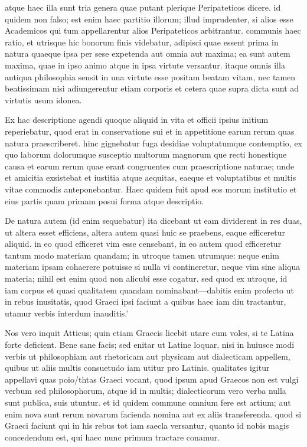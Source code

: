  atque haec illa sunt tria genera quae putant plerique Peripateticos dicere. id quidem non falso; est enim haec partitio illorum; illud imprudenter, si alios esse Academicos qui tum appellarentur alios Peripateticos arbitrantur. communis haec ratio, et utrisque hic bonorum finis videbatur, adipisci quae essent prima in natura quaeque ipsa per sese expetenda aut omnia aut maxima; ea sunt autem maxima, quae in ipso animo atque in ipsa virtute versantur. itaque omnis illa antiqua philosophia sensit in una virtute esse positam beatam vitam, nec tamen beatissimam nisi adiungerentur etiam corporis et cetera quae supra dicta sunt ad virtutis usum idonea.

 Ex hac descriptione agendi quoque aliquid in vita et officii ipsius initium reperiebatur, quod erat in conservatione sui et in appetitione earum rerum quas natura praescriberet. hinc gignebatur fuga desidiae voluptatumque contemptio, ex quo laborum dolorumque susceptio multorum magnorum que recti honestique causa et earum rerum quae erant congruentes cum praescriptione naturae; unde et amicitia exsistebat et iustitia atque aequitas, eaeque et voluptatibus et multis vitae commodis anteponebantur. Haec quidem fuit apud eos morum institutio et eius partis quam primam posui forma atque descriptio.

 De natura autem (id enim sequebatur) ita dicebant ut eam dividerent in res duas, ut altera esset efficiens, altera autem quasi huic se praebens, eaque efficeretur aliquid. in eo quod efficeret vim esse censebant, in eo autem quod efficeretur tantum modo materiam quandam; in utroque tamen utrumque: neque enim materiam ipsam cohaerere potuisse si nulla vi contineretur, neque vim sine aliqua materia; nihil est enim quod non alicubi esse cogatur. sed quod ex utroque, id iam corpus et quasi qualitatem quandam nominabant—dabitis enim profecto ut in rebus inusitatis, quod Graeci ipsi faciunt a quibus haec iam diu tractantur, utamur verbis interdum inauditis.'

 Nos vero inquit Atticus; quin etiam Graecis licebit utare cum voles, si te Latina forte deficient. Bene sane facis; sed enitar ut Latine loquar, nisi in huiusce modi verbis ut philosophiam aut rhetoricam aut physicam aut dialecticam appellem, quibus ut aliis multis consuetudo iam utitur pro Latinis. qualitates igitur appellavi quas poio/thtas Graeci vocant, quod ipsum apud Graecos non est vulgi verbum sed philosophorum, atque id in multis; dialecticorum vero verba nulla sunt publica, suis utuntur. et id quidem commune omnium fere est artium; aut enim nova sunt rerum novarum facienda nomina aut ex aliis transferenda. quod si Graeci faciunt qui in his rebus tot iam saecla versantur, quanto id nobis magis concedendum est, qui haec nunc primum tractare conamur.

